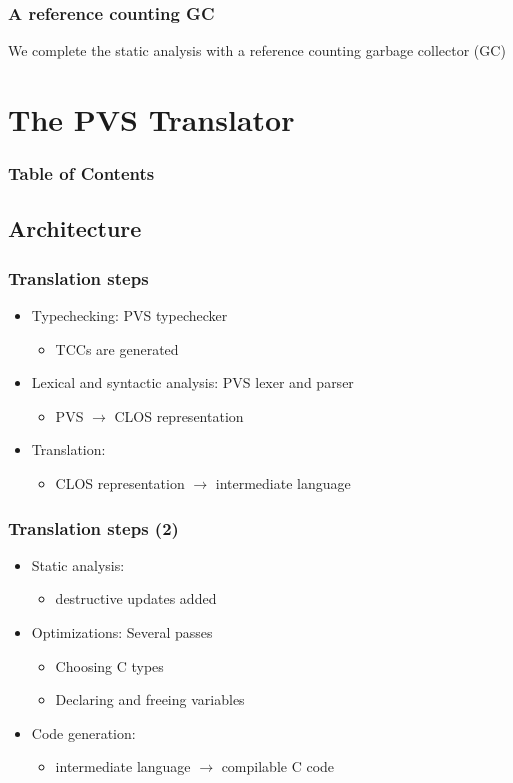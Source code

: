 \documentclass{beamer}
\begin{document}
\begin{frame}
\frametitle{A reference counting GC}
We complete the static analysis with a reference counting garbage collector (GC)
\end{frame}



\section{The PVS Translator}
\begin{frame}
\frametitle{Table of Contents}
\tableofcontents[currentsection]
\end{frame}

\subsection{Architecture}

\begin{frame}
\frametitle{Translation steps}
\begin{itemize}
\item Typechecking: PVS typechecker
\begin{itemize}
\item TCCs are generated
\end{itemize}
\item Lexical and syntactic analysis: PVS lexer and parser
\begin{itemize}
\item PVS $\longrightarrow$ CLOS representation
\end{itemize}
\item Translation:
\begin{itemize}
\item CLOS representation $\longrightarrow$ intermediate language
\end{itemize}
\end{itemize}
\end{frame}

\begin{frame}
\frametitle{Translation steps (2)}
\begin{itemize}
\item Static analysis:
\begin{itemize}
\item destructive updates added
\end{itemize}
\item Optimizations: Several passes
\begin{itemize}
\item Choosing C types
\item Declaring and freeing variables
\end{itemize}
\item Code generation: 
\begin{itemize}
\item intermediate language $\longrightarrow$ compilable C code
\end{itemize}
\end{itemize}
\end{frame}
\end{document}
